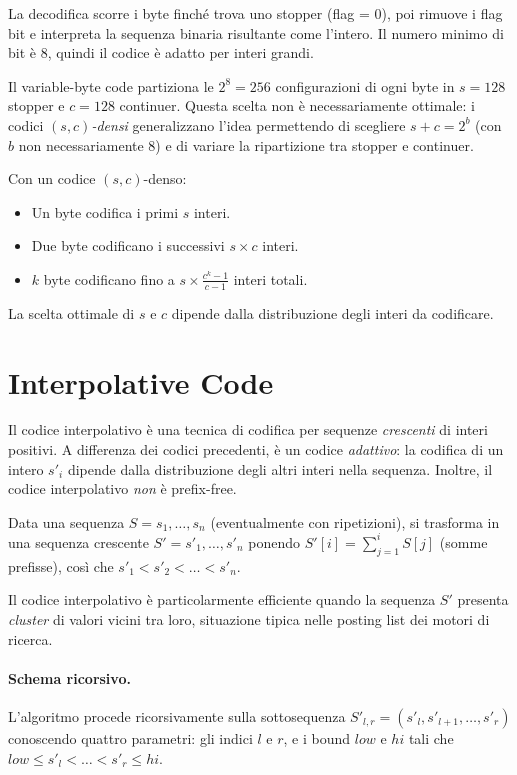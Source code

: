 \documentclass[12pt, a4paper, oneside]{book}
\theoremstyle{plain}
\theoremstyle{definition}
\theoremstyle{remark}
\begin{document}
La decodifica scorre i byte finché trova uno stopper (flag = 0), poi rimuove i flag bit e interpreta la sequenza binaria risultante come l'intero. Il numero minimo di bit è 8, quindi il codice è adatto per interi grandi.

Il variable-byte code partiziona le $2^8 = 256$ configurazioni di ogni byte in $s = 128$ stopper e $c = 128$ continuer. Questa scelta non è necessariamente ottimale: i codici \emph{$(s,c)$-densi} generalizzano l'idea permettendo di scegliere $s + c = 2^b$ (con $b$ non necessariamente 8) e di variare la ripartizione tra stopper e continuer.

Con un codice $(s,c)$-denso:
\begin{itemize}
  \item Un byte codifica i primi $s$ interi.
  \item Due byte codificano i successivi $s \times c$ interi.
  \item $k$ byte codificano fino a $s \times \frac{c^k - 1}{c - 1}$ interi totali.
\end{itemize}

La scelta ottimale di $s$ e $c$ dipende dalla distribuzione degli interi da codificare.

\section{Interpolative Code}
\label{sec:interpolative-code}

Il codice interpolativo è una tecnica di codifica per sequenze \emph{crescenti} di interi positivi. A differenza dei codici precedenti, è un codice \emph{adattivo}: la codifica di un intero $s'_i$ dipende dalla distribuzione degli altri interi nella sequenza. Inoltre, il codice interpolativo \emph{non} è prefix-free.

Data una sequenza $S = s_1, \ldots, s_n$ (eventualmente con ripetizioni), si trasforma in una sequenza crescente $S' = s'_1, \ldots, s'_n$ ponendo $S'[i] = \sum_{j=1}^i S[j]$ (somme prefisse), così che $s'_1 < s'_2 < \ldots < s'_n$.

Il codice interpolativo è particolarmente efficiente quando la sequenza $S'$ presenta \emph{cluster} di valori vicini tra loro, situazione tipica nelle posting list dei motori di ricerca.

\paragraph{Schema ricorsivo.}
L'algoritmo procede ricorsivamente sulla sottosequenza $S'_{l,r} = (s'_l, s'_{l+1}, \ldots, s'_r)$ conoscendo quattro parametri: gli indici $l$ e $r$, e i bound $\mathit{low}$ e $\mathit{hi}$ tali che $\mathit{low} \leq s'_l < \ldots < s'_r \leq \mathit{hi}$.
\end{document}
